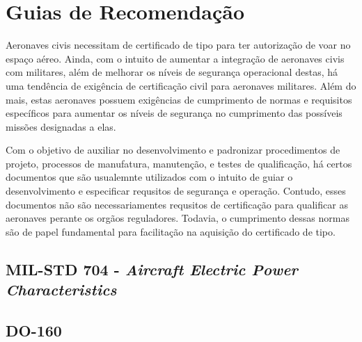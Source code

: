 \section{Guias de Recomendação}

Aeronaves civis necessitam de certificado de tipo para ter autorização de voar no espaço aéreo. Ainda, com o intuito de aumentar a integração de aeronaves civis com militares, além de melhorar os níveis de segurança operacional destas, há uma tendência de exigência de certificação civil para aeronaves militares. Além do mais, estas aeronaves possuem exigências de cumprimento de normas e requisitos específicos para aumentar os níveis de segurança no cumprimento das possíveis missões designadas a elas.

Com o objetivo de auxiliar no desenvolvimento e padronizar procedimentos de projeto, processos de manufatura, manutenção, e testes de qualificação, há certos documentos que são usualemnte utilizados com o intuito de guiar o desenvolvimento e especificar requsitos de segurança e operação. Contudo, esses documentos não são necessariamentes requsitos de certificação para qualificar as aeronaves perante os orgãos reguladores. Todavia, o cumprimento dessas normas são de papel fundamental para facilitação na aquisição do certificado de tipo. 

\subsection{MIL-STD 704 - \textit{Aircraft Electric Power Characteristics}}



\subsection{DO-160}
